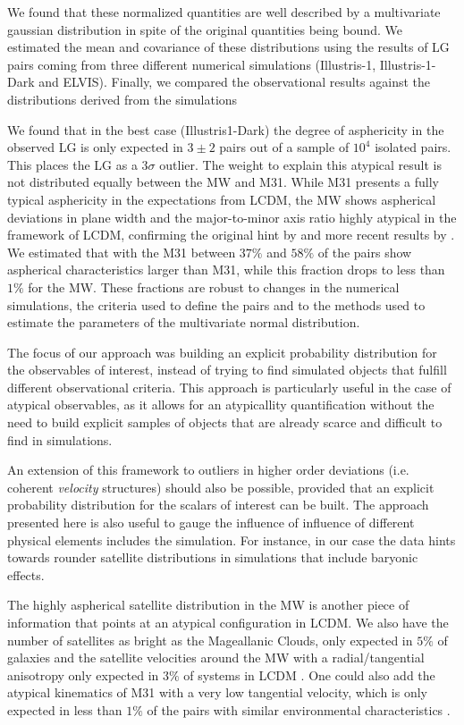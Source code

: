 \documentclass[a4paper,fleqn,usenatbib]{mnras}
\begin{document}
We found that these normalized quantities are well described by
a multivariate gaussian distribution in spite of the original
quantities being bound.
We estimated the mean and covariance of {\color{red}these} distributions using
the results of LG pairs coming from three different numerical
simulations (Illustris-1, Illustris-1-Dark and ELVIS). 
Finally, we compared the observational results against the
distributions derived from the simulations

We found that in the best case (Illustris1-Dark) the degree of
asphericity in the observed LG is only expected in $3\pm2$ pairs out
of a sample of $10^4$ isolated pairs. 
This places the LG as a $3\sigma$ outlier.   
The weight to explain this atypical result is not distributed equally
between the MW and M31. 
While M31 presents a fully typical asphericity in the expectations
from LCDM, the MW shows aspherical deviations in plane width and the
major-to-minor axis ratio highly atypical in the framework of LCDM,
confirming the original hint by \cite{2005A&A...431..517K} and more
recent results by \cite{2015ApJ...815...19P}. 
We estimated that with the M31 between $37\%$ and $58\%$ of the pairs show aspherical characteristics larger than M31, while
this fraction drops to less than $1\%$ for the MW. 
These fractions are robust to changes in the numerical simulations, 
the criteria used to define the pairs and to the methods used to
estimate the parameters of the multivariate normal distribution. 


The focus of our approach was building an explicit probability
distribution for the observables of interest, instead of trying to
find simulated objects that fulfill different observational criteria. 
This approach is particularly useful in the case of atypical
observables, as it allows for an atypicallity
quantification without the need to build explicit samples of objects
that are already scarce and difficult to find in simulations.

An extension of this framework to outliers in higher order deviations
(i.e. coherent \emph{velocity} structures) should also be possible, 
provided that an explicit probability distribution for the scalars of
interest can be built.  
The approach presented here is also useful to gauge the influence of 
influence of different physical elements includes the simulation. 
For instance, in our case the data hints towards rounder satellite
distributions in simulations that include baryonic effects.   


The highly aspherical satellite distribution in the MW is another piece of
information that points at an atypical configuration in LCDM.
We also have the number of satellites as bright as the Mageallanic
Clouds, only expected in $5\%$ of galaxies
\citep{2011ApJ...743..117B} and 
the satellite velocities around the MW with a radial/tangential
anisotropy only expected in $3\%$ of systems in LCDM
\citep{2017MNRAS.468L..41C}. 
One could also add the atypical kinematics of M31 with a very low
tangential velocity, which is only expected in less than $1\%$ of the pairs
with similar environmental characteristics \citep{ForeroRomero2013}.  
\end{document}

